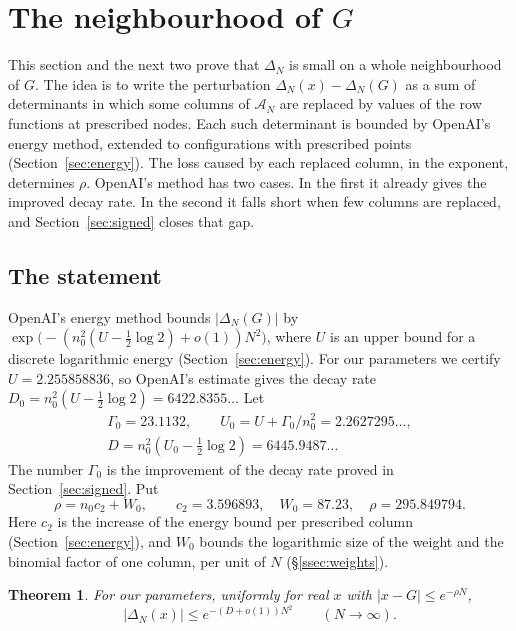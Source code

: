 \documentclass[11pt]{amsart}
\newcommand{\Rho}{295.849794}
\newcommand{\Ctwo}{3.596893}
\newcommand{\WZero}{87.23}
\newcommand{\Utarget}{2.255858836}
\newcommand{\Gain}{23.1132}
\newcommand{\Uzero}{2.2627295}
\newcommand{\Decay}{6445.9487}
\newcommand{\DecayOA}{6422.8355}
\newtheorem{theorem}{Theorem}[section]
\theoremstyle{definition}
\theoremstyle{remark}
\numberwithin{equation}{section}
\newcommand{\cA}{\mathcal A}
\begin{document}
\section{The neighbourhood of $G$}\label{sec:real}

This section and the next two prove that $\Delta_N$ is small on a whole neighbourhood of $G$. The idea is to
write the perturbation $\Delta_N(x)-\Delta_N(G)$ as a sum of determinants in which some columns of $\cA_N$
are replaced by values of the row functions at prescribed nodes. Each such determinant is bounded by
OpenAI's energy method, extended to configurations with prescribed points (Section~\ref{sec:energy}). The
loss caused by each replaced column, in the exponent, determines $\rho$. OpenAI's method has two cases. In
the first it already gives the improved decay rate. In the second it falls short when few columns are
replaced, and Section~\ref{sec:signed} closes that gap.

\subsection{The statement}
OpenAI's energy method bounds $|\Delta_N(G)|$ by $\exp\bigl(-(n_0^2(U-\frac12\log2)+o(1))N^2\bigr)$, where $U$
is an upper bound for a discrete logarithmic energy (Section~\ref{sec:energy}). For our parameters we
certify $U=\Utarget$, so OpenAI's estimate gives the decay rate $D_0=n_0^2(U-\frac12\log2)=\DecayOA\ldots$
Let
\begin{gather*}
 \Gamma_0=\Gain,\qquad U_0=U+\Gamma_0/n_0^2=\Uzero\ldots,\\
 D=n_0^2(U_0-\tfrac12\log2)=\Decay\ldots
\end{gather*}
The number $\Gamma_0$ is the improvement of the decay rate proved in Section~\ref{sec:signed}. Put
\begin{equation}\label{eq:rho-def}
 \rho=n_0c_2+W_0,\qquad c_2=\Ctwo,\quad W_0=\WZero,\quad \rho=\Rho .
\end{equation}
Here $c_2$ is the increase of the energy bound per prescribed column (Section~\ref{sec:energy}), and $W_0$
bounds the logarithmic size of the weight and the binomial factor of one column, per unit of $N$
(\S\ref{ssec:weights}).

\begin{theorem}\label{thm:real}
For our parameters, uniformly for real $x$ with $|x-G|\le e^{-\rho N}$,
\[
 |\Delta_N(x)|\le e^{-(D+o(1))N^2}\qquad(N\to\infty).
\]
\end{theorem}
\end{document}
